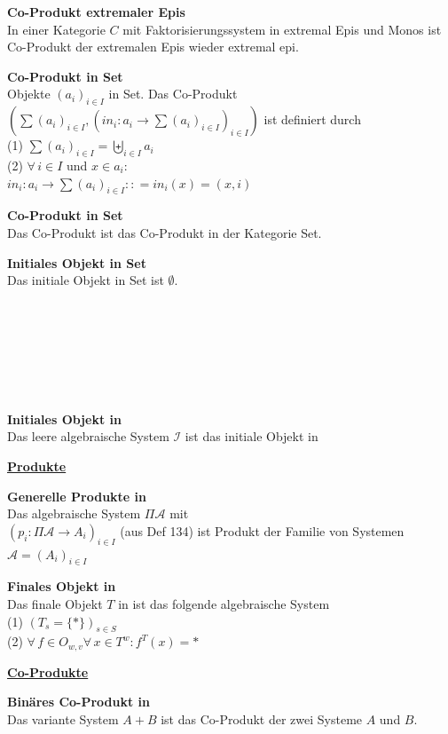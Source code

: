 \begin{multicols}{2}
\textbf{ Co-Produkt extremaler Epis} \\
In einer Kategorie $C$ mit Faktorisierungssystem in extremal Epis und Monos ist Co-Produkt der extremalen Epis wieder extremal epi.

\textbf{ Co-Produkt in Set} \\
Objekte $(a_i)_{i \in I}$ in Set. Das Co-Produkt $\left(\sum(a_{i})_{i\in I},\left(in_{i}:a_{i} \rightarrow \sum (a_{i})_{i\in I}\right)_{i\in I}\right)$ ist definiert durch \\
(1) $\sum(a_{i})_{i\in I}=\biguplus_{i \in I} a_i$\\
(2) $\forall \, i\in I$ und $x\in a_{i} $: \\ $in_i: a_i \rightarrow \sum(a_i)_{i \in I} :: = in_i(x) = (x,i)$

\textbf{ Co-Produkt in Set} \\
Das Co-Produkt ist das Co-Produkt in der Kategorie Set.


\textbf{ Initiales Objekt in Set} \\
Das initiale Objekt in Set ist $\emptyset$.
\\
\\
\\
\\
\\
\\
\\
\\
\textbf{ Initiales Objekt in \syssig} \\
Das leere algebraische System $\mathcal{I}$ ist das initiale Objekt in \syssig



\end{multicols}



\begin{multicols}{2}

\textbf{\underline{Produkte}} 

\textbf{ Generelle Produkte in \syssig} \\
Das algebraische System $\Pi \mathcal{A}$ mit \\ $(p_i: \Pi \mathcal{A} \rightarrow A_i)_{i \in I}$ (aus Def 134) ist Produkt der Familie von Systemen $\mathcal{A} = (A_i)_{i \in I}$


\textbf{ Finales Objekt in \syssig} \\
Das finale Objekt $T$ in \syssig ist das folgende algebraische System \\
(1) $(T_s = \{*\})_{s \in S}$ \\
(2) $\forall \, f \in O_{w,v} \forall \, x \in T^w: f^T(x)=*$

\columnbreak

\textbf{\underline{Co-Produkte}} 

\textbf{ Binäres Co-Produkt in \syssig} \\
Das variante System $A + B$ ist das Co-Produkt der zwei Systeme $A$ und $B$.

\end{multicols}


